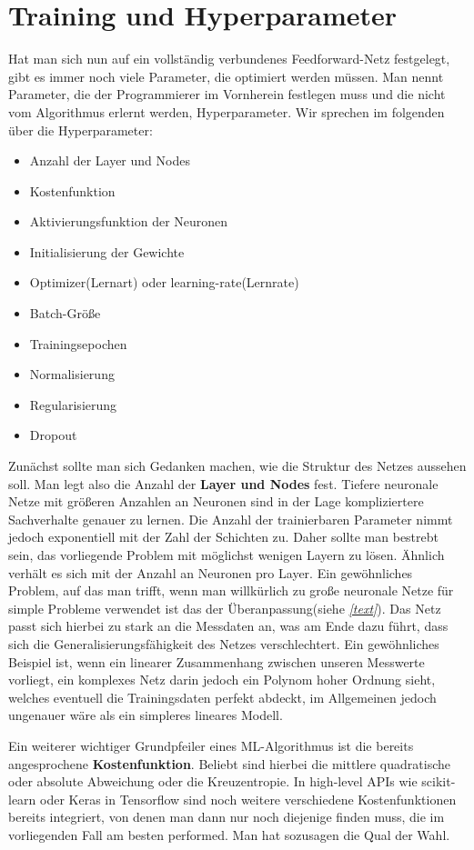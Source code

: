 \section{Training und Hyperparameter}
Hat man sich nun auf ein vollständig verbundenes Feedforward-Netz festgelegt, gibt es immer noch viele Parameter, die optimiert werden müssen. Man nennt Parameter, die der Programmierer im Vornherein festlegen muss und die nicht vom Algorithmus erlernt werden, Hyperparameter. Wir sprechen im folgenden über die Hyperparameter:
\begin{itemize}
	\item Anzahl der Layer und Nodes
	\item Kostenfunktion
	\item Aktivierungsfunktion der Neuronen
	\item Initialisierung der Gewichte
	\item Optimizer(Lernart) oder learning-rate(Lernrate)
	\item Batch-Größe
	\item Trainingsepochen
	\item Normalisierung
	\item Regularisierung
	\item Dropout
\end{itemize}
Zunächst sollte man sich Gedanken machen, wie die Struktur des Netzes aussehen soll. Man legt also die Anzahl der \textbf{Layer und Nodes} fest. Tiefere neuronale Netze mit größeren Anzahlen an Neuronen sind in der Lage kompliziertere Sachverhalte genauer zu lernen. Die Anzahl der trainierbaren Parameter nimmt jedoch exponentiell mit der Zahl der Schichten zu. Daher sollte man bestrebt sein, das vorliegende Problem mit möglichst wenigen Layern zu lösen. Ähnlich verhält es sich mit der Anzahl an Neuronen pro Layer. Ein gewöhnliches Problem, auf das man trifft, wenn man willkürlich zu große neuronale Netze für simple Probleme verwendet ist das der Überanpassung(siehe \textit{\autoref{text}}). Das Netz passt sich hierbei zu stark an die Messdaten an, was am Ende dazu führt, dass sich die Generalisierungsfähigkeit des Netzes verschlechtert. Ein gewöhnliches Beispiel ist, wenn ein linearer Zusammenhang zwischen unseren Messwerte vorliegt, ein komplexes Netz darin jedoch ein Polynom hoher Ordnung sieht, welches eventuell die Trainingsdaten perfekt abdeckt, im Allgemeinen jedoch ungenauer wäre als ein simpleres lineares Modell.

Ein weiterer wichtiger Grundpfeiler eines ML-Algorithmus ist die bereits angesprochene \textbf{Kostenfunktion}. Beliebt sind hierbei die mittlere quadratische oder absolute Abweichung oder die Kreuzentropie. In high-level APIs wie scikit-learn oder Keras in Tensorflow sind noch weitere verschiedene Kostenfunktionen bereits integriert, von denen man dann nur noch diejenige finden muss, die im vorliegenden Fall am besten performed. Man hat sozusagen die Qual der Wahl. 

